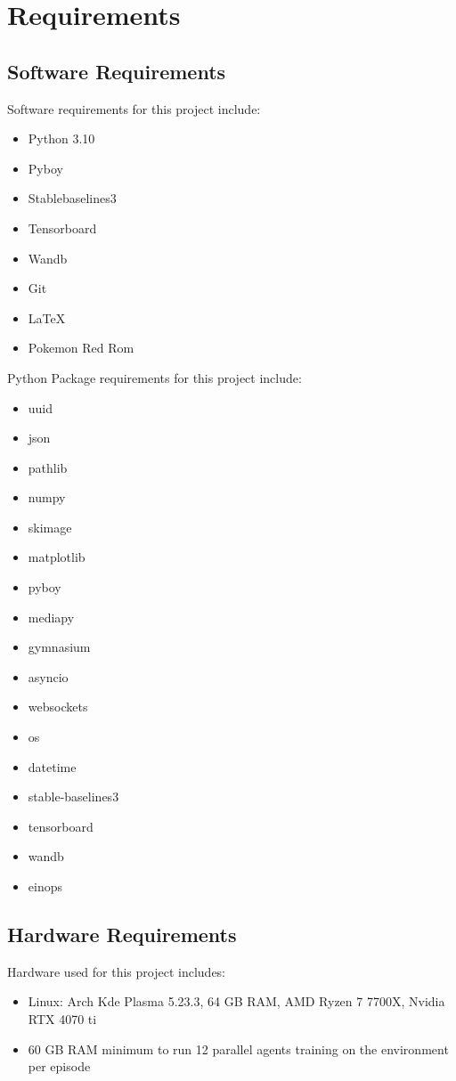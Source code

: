 \section{Requirements}

\subsection{Software Requirements}

Software requirements for this project include:

\begin{itemize}
    \item Python 3.10
    \item Pyboy
    \item Stablebaselines3
    \item Tensorboard
    \item Wandb
    \item Git
    \item LaTeX
    \item Pokemon Red Rom
\end{itemize}

Python Package requirements for this project include: 

\begin{multicols}{2}
\begin{itemize}
    \item uuid
    \item json
    \item pathlib
    \item numpy
    \item skimage
    \item matplotlib
    \item pyboy
    \item mediapy
    \item gymnasium
    \item asyncio
    \item websockets
    \item os
    \item datetime
    \item stable-baselines3
    \item tensorboard
    \item wandb
    \item einops
\end{itemize}
\end{multicols}

\subsection{Hardware Requirements}

Hardware used for this project includes:
\begin{itemize}
    \item Linux: Arch Kde Plasma 5.23.3, 64 GB RAM, AMD Ryzen 7 7700X, Nvidia RTX 4070 ti
    \item 60 GB RAM minimum to run 12 parallel agents training on the environment per episode
\end{itemize}

